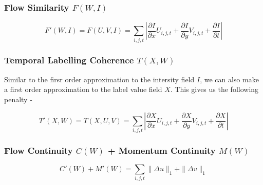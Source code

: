 \subsubsection*{Flow Similarity $F(W,I)$}

\begin{equation}
F'(W,I)=F(U,V,I)=\underset{i,j,t}{\sum}|\frac{\partial I}{\partial x}U_{i,j,t}+\frac{\partial I}{\partial y}V_{i,j,t}+\frac{\partial I}{\partial t}|
\end{equation}


\subsubsection*{Temporal Labelling Coherence $T(X,W)$}

Similar to the firsr order approximation to the intersity field $I$,
we can also make a first order approximation to the label value field
$X$. This gives us the following penalty -

\begin{equation}
T'(X,W)=T(X,U,V)=\underset{i,j,t}{\sum}|\frac{\partial X}{\partial x}U_{i,j,t}+\frac{\partial X}{\partial y}V_{i,j,t}+\frac{\partial X}{\partial t}|
\end{equation}



\subsubsection*{Flow Continuity $C(W)$ + Momentum Continuity $M(W)$}

\begin{equation}
C'(W)+M'(W)=\underset{i,j,t}{\sum}\|\Delta u\|_{1}+\|\Delta v\|_{1}
\end{equation}


